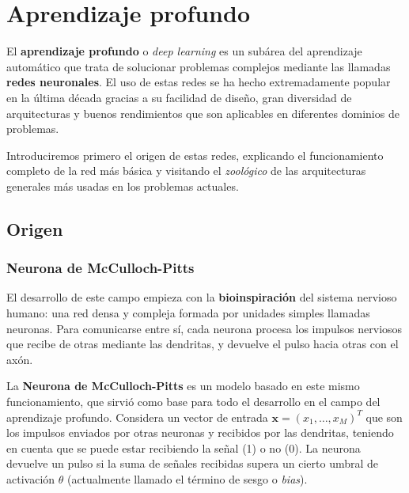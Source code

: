 %

\chapter{Aprendizaje profundo}\label{ch:dl}

El \textbf{aprendizaje profundo} o \emph{deep learning} es un subárea del aprendizaje automático que trata de solucionar problemas complejos mediante las llamadas \textbf{redes neuronales}. El uso de estas redes se ha hecho extremadamente popular en la última década gracias a su facilidad de diseño, gran diversidad de arquitecturas y buenos rendimientos que son aplicables en diferentes dominios de problemas.

Introduciremos primero el origen de estas redes, explicando el funcionamiento completo de la red más básica y visitando el \emph{zoológico} de las arquitecturas generales más usadas en los problemas actuales.

\section{Origen}

\subsection{Neurona de McCulloch-Pitts}

El desarrollo de este campo empieza con la \textbf{bioinspiración} del sistema nervioso humano: una red densa y compleja formada por unidades simples llamadas neuronas. Para comunicarse entre sí, cada neurona procesa los impulsos nerviosos que recibe de otras mediante las dendritas, y devuelve el pulso hacia otras con el axón.

La \textbf{Neurona de McCulloch-Pitts} \cite{mcculloch1943logical} es un modelo basado en este mismo funcionamiento, que sirvió como base para todo el desarrollo en el campo del aprendizaje profundo. Considera un vector de entrada $\textbf{x} = (x_1, \ldots, x_M)^T$ que son los impulsos enviados por otras neuronas y recibidos por las dendritas, teniendo en cuenta que se puede estar recibiendo la señal (1) o no (0). La neurona devuelve un pulso si la suma de señales recibidas supera un cierto umbral de activación $\theta$ (actualmente llamado el término de sesgo o \emph{bias}).

